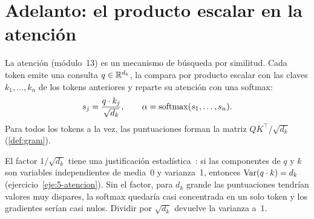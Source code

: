 \section{Adelanto: el producto escalar en la atención}

La atención (módulo~13) es un mecanismo de búsqueda por similitud. Cada token emite una consulta $q\in\mathbb{R}^{d_k}$, la compara por producto escalar con las claves $k_1,\dots,k_n$ de los tokens anteriores y reparte su atención con una softmax:
\[
s_j=\frac{q\cdot k_j}{\sqrt{d_k}},\qquad \alpha=\operatorname{softmax}(s_1,\dots,s_n).
\]
Para todos los tokens a la vez, las puntuaciones forman la matriz $QK^{\top}/\sqrt{d_k}$ (\cref{def:gram}).

\addtocounter{definicion}{1}%

El factor $1/\sqrt{d_k}$ tiene una justificación estadística~\cite[§3.2.1]{vaswani}: si las componentes de $q$ y $k$ son variables independientes de media~0 y varianza~1, entonces $\operatorname{Var}(q\cdot k)=d_k$ (ejercicio~\ref{eje:5-atencion}). Sin el factor, para $d_k$ grande las puntuaciones tendrían valores muy dispares, la softmax quedaría casi concentrada en un solo token y los gradientes serían casi nulos. Dividir por $\sqrt{d_k}$ devuelve la varianza a~1.

